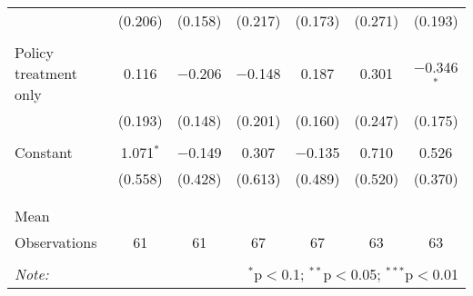 \begin{tabular}{@{\extracolsep{5pt}}lcccccc}
  & (0.206) & (0.158) & (0.217) & (0.173) & (0.271) & (0.193) \\ 
  & & & & & & \\ 
 Policy treatment only & 0.116 & $-$0.206 & $-$0.148 & 0.187 & 0.301 & $-$0.346$^{*}$ \\ 
  & (0.193) & (0.148) & (0.201) & (0.160) & (0.247) & (0.175) \\ 
  & & & & & & \\ 
 Constant & 1.071$^{*}$ & $-$0.149 & 0.307 & $-$0.135 & 0.710 & 0.526 \\ 
  & (0.558) & (0.428) & (0.613) & (0.489) & (0.520) & (0.370) \\ 
  & & & & & & \\ 
\hline \\[-1.8ex] 
Mean &  &  &  &  &  &  \\ 
Observations & 61 & 61 & 67 & 67 & 63 & 63 \\ 
\hline 
\hline \\[-1.8ex] 
\textit{Note:}  & \multicolumn{6}{r}{$^{*}$p$<$0.1; $^{**}$p$<$0.05; $^{***}$p$<$0.01} \\ 
\end{tabular} 
